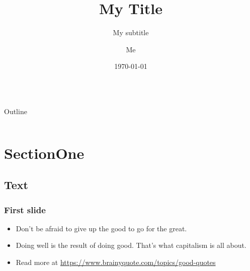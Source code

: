 \documentclass[aspectratio=169, serif ]{beamer}
\title{My Title}
\subtitle{My subtitle}
\author{Me}
\institute{\texorpdfstring{ Example College\newline Example University \newline \url{example@example.com}}{}}
\date{\today}
\begin{document}
\begingroup
{}
{
\begin{frame}
 \titlepage
\end{frame}
}
\endgroup

\begin{frame}
    \frametitle{}
    \begin{columns}
            \begin{flushright}
                \textcolor{FluorescentGreen}{\huge Outline}
            \end{flushright}
            
            \tableofcontents
    \end{columns}
\end{frame}


\section{SectionOne}
\subsection{Text}

\begin{frame}
\frametitle{First slide}
    \begin{itemize}
        \item Don't be afraid to give up the good to go for the great.
        \item Doing well is the result of doing good. That's what capitalism is all about.
        \item Read more at  \url{https://www.brainyquote.com/topics/good-quotes}  
    \end{itemize}
\end{frame}
\end{document}
